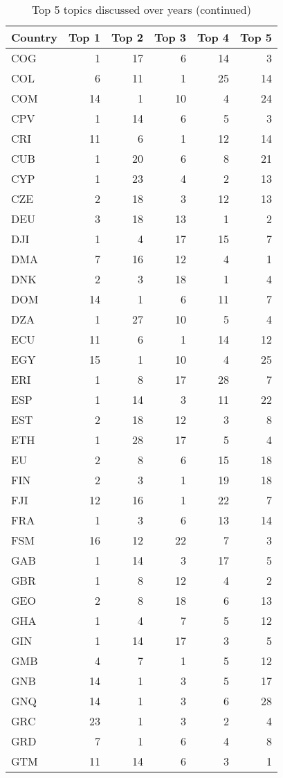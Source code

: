     
    
    \begin{table}
    \centering
    \caption{Top 5 topics discussed over years (continued)}
    \label{tab:top 5 topics all2}
    \begin{tabular}{lrrrrr}
    \toprule
    Country &     Top 1 &     Top 2 &     Top 3 &     Top 4 &     Top 5 \\
    \midrule
    COG  & 1 & 17 & 6 & 14 & 3\\
    COL  & 6 & 11 & 1 & 25 & 14\\
    COM  & 14 & 1 & 10 & 4 & 24\\
    CPV  & 1 & 14 & 6 & 5 & 3\\
    CRI  & 11 & 6 & 1 & 12 & 14\\
    CUB  & 1 & 20 & 6 & 8 & 21\\
    CYP  & 1 & 23 & 4 & 2 & 13\\
    CZE  & 2 & 18 & 3 & 12 & 13\\
    DEU  & 3 & 18 & 13 & 1 & 2\\
    DJI  & 1 & 4 & 17 & 15 & 7\\
    DMA  & 7 & 16 & 12 & 4 & 1\\
    DNK  & 2 & 3 & 18 & 1 & 4\\
    DOM  & 14 & 1 & 6 & 11 & 7\\
    DZA  & 1 & 27 & 10 & 5 & 4\\
    ECU  & 11 & 6 & 1 & 14 & 12\\
    EGY  & 15 & 1 & 10 & 4 & 25\\
    ERI  & 1 & 8 & 17 & 28 & 7\\
    ESP  & 1 & 14 & 3 & 11 & 22\\
    EST  & 2 & 18 & 12 & 3 & 8\\
    ETH  & 1 & 28 & 17 & 5 & 4\\
     EU  & 2 & 8 & 6 & 15 & 18\\
    FIN  & 2 & 3 & 1 & 19 & 18\\
    FJI  & 12 & 16 & 1 & 22 & 7\\
    FRA  & 1 & 3 & 6 & 13 & 14\\
    FSM  & 16 & 12 & 22 & 7 & 3\\
    GAB  & 1 & 14 & 3 & 17 & 5\\
    GBR  & 1 & 8 & 12 & 4 & 2\\
    GEO  & 2 & 8 & 18 & 6 & 13\\
    GHA  & 1 & 4 & 7 & 5 & 12\\
    GIN  & 1 & 14 & 17 & 3 & 5\\
    GMB  & 4 & 7 & 1 & 5 & 12\\
    GNB  & 14 & 1 & 3 & 5 & 17\\
    GNQ  & 14 & 1 & 3 & 6 & 28\\
    GRC  & 23 & 1 & 3 & 2 & 4\\
    GRD  & 7 & 1 & 6 & 4 & 8\\
    GTM  & 11 & 14 & 6 & 3 & 1\\
    \bottomrule
    \end{tabular}\end{table}
    
